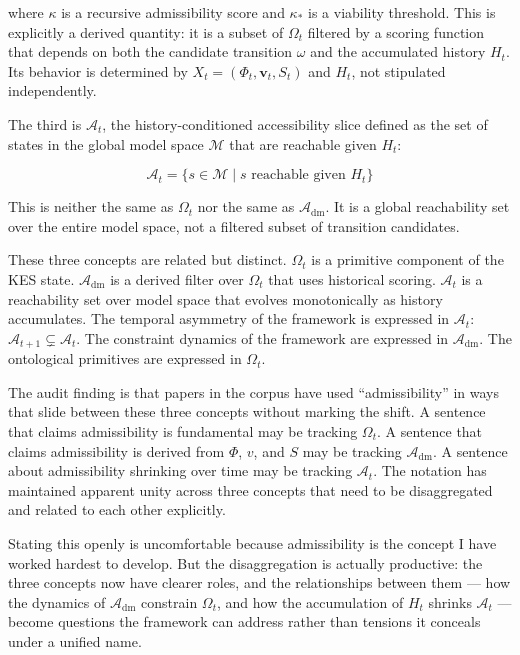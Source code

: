 \documentclass[12pt, a4paper]{article}
\begin{document}
where $\kappa$ is a recursive admissibility score and $\kappa_*$ is a viability threshold. This is explicitly a derived quantity: it is a subset of $\Omega_t$ filtered by a scoring function that depends on both the candidate transition $\omega$ and the accumulated history $H_t$. Its behavior is determined by $X_t = (\Phi_t, \mathbf{v}_t, S_t)$ and $H_t$, not stipulated independently.

The third is $\mathcal{A}_t$, the history-conditioned accessibility slice defined as the set of states in the global model space $\mathcal{M}$ that are reachable given $H_t$:

\[
\mathcal{A}_t = \bigl\{s \in \mathcal{M} \mid s \text{ reachable given } H_t\bigr\}
\]

This is neither the same as $\Omega_t$ nor the same as $\mathcal{A}_{\mathrm{dm}}$. It is a global reachability set over the entire model space, not a filtered subset of transition candidates.

These three concepts are related but distinct. $\Omega_t$ is a primitive component of the KES state. $\mathcal{A}_{\mathrm{dm}}$ is a derived filter over $\Omega_t$ that uses historical scoring. $\mathcal{A}_t$ is a reachability set over model space that evolves monotonically as history accumulates. The temporal asymmetry of the framework is expressed in $\mathcal{A}_t$: $\mathcal{A}_{t+1} \subsetneq \mathcal{A}_t$. The constraint dynamics of the framework are expressed in $\mathcal{A}_{\mathrm{dm}}$. The ontological primitives are expressed in $\Omega_t$.

The audit finding is that papers in the corpus have used \enquote{admissibility} in ways that slide between these three concepts without marking the shift. A sentence that claims admissibility is fundamental may be tracking $\Omega_t$. A sentence that claims admissibility is derived from $\Phi$, $v$, and $S$ may be tracking $\mathcal{A}_{\mathrm{dm}}$. A sentence about admissibility shrinking over time may be tracking $\mathcal{A}_t$. The notation has maintained apparent unity across three concepts that need to be disaggregated and related to each other explicitly.

Stating this openly is uncomfortable because admissibility is the concept I have worked hardest to develop. But the disaggregation is actually productive: the three concepts now have clearer roles, and the relationships between them --- how the dynamics of $\mathcal{A}_{\mathrm{dm}}$ constrain $\Omega_t$, and how the accumulation of $H_t$ shrinks $\mathcal{A}_t$ --- become questions the framework can address rather than tensions it conceals under a unified name.
\end{document}
